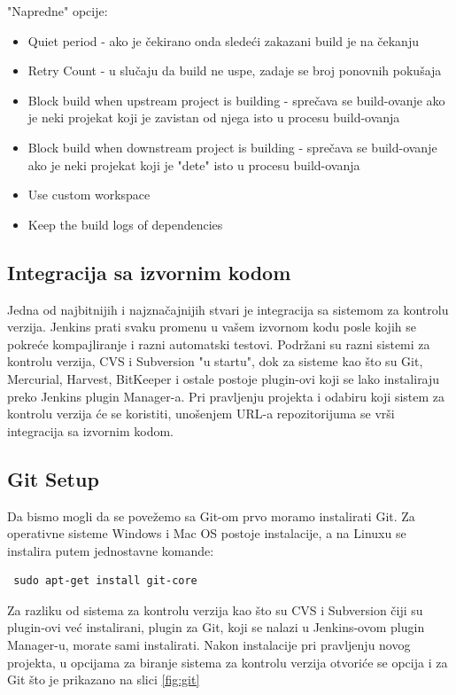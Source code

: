 "Napredne" opcije:
\begin{itemize}  
\item Quiet period - ako je čekirano onda sledeći zakazani build je na čekanju
\item Retry Count - u slučaju da build ne uspe, zadaje se broj ponovnih pokušaja
\item Block build when upstream project is building - sprečava se build-ovanje ako je neki projekat koji je zavistan od njega isto u procesu build-ovanja
\item Block build when downstream project is building - sprečava se build-ovanje ako je neki projekat koji je "dete" isto u procesu build-ovanja
\item Use custom workspace
\item Keep the build logs of dependencies
\end{itemize}

\subsection{Integracija sa izvornim kodom}

Jedna od najbitnijih i najznačajnijih stvari je integracija sa sistemom za kontrolu verzija. Jenkins prati svaku promenu u vašem izvornom kodu posle kojih se pokreće kompajliranje i razni automatski testovi. Podržani su razni sistemi za kontrolu verzija, CVS i Subversion "u startu", dok za sisteme kao što su Git, Mercurial, Harvest, BitKeeper i ostale postoje plugin-ovi koji se lako instaliraju preko Jenkins plugin Manager-a. Pri pravljenju projekta i odabiru koji sistem za kontrolu verzija će se koristiti, unošenjem URL-a repozitorijuma se vrši integracija sa izvornim kodom.

\subsection{Git Setup}

Da bismo mogli da se povežemo sa Git-om prvo moramo instalirati Git. Za operativne sisteme Windows i Mac OS postoje instalacije, a na Linuxu se instalira putem jednostavne komande:

\begin{verbatim}
 sudo apt-get install git-core
\end{verbatim}

Za razliku od sistema za kontrolu verzija kao što su CVS i Subversion čiji su plugin-ovi već instalirani, plugin za Git, koji se nalazi u Jenkins-ovom plugin Manager-u, morate sami instalirati. Nakon instalacije pri pravljenju novog projekta, u opcijama za biranje sistema za kontrolu verzija otvoriće se opcija i za Git što je prikazano na slici \ref{fig:git}

